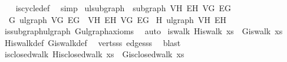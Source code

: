 \begin{isabellebody}
%
\isadelimproof
\ \ %
\endisadelimproof
%
\isatagproof
{}\isamarkupfalse%
\ is{\isacharunderscore}{\kern0pt}cycle{}{\isacharunderscore}{\kern0pt}def\ \isamarkupfalse%
\ simp%
\endisatagproof
{\isafoldproof}%
%
\isadelimproof
%
\endisadelimproof
%
\isadelimdocument
%
\endisadelimdocument
%
\isatagdocument
%
\isamarkuptrue%
%
\endisatagdocument
{\isafolddocument}%
%
\isadelimdocument
%
\endisadelimdocument
{}\isamarkupfalse%
\ ulsubgraph\ {\isacharequal}{\kern0pt}\ subgraph\ V\isactrlsub H\ E\isactrlsub H\ V\isactrlsub G\ E\isactrlsub G\ {\isacharplus}{\kern0pt}\isanewline
\ \ G{\isacharcolon}{\kern0pt}\ ulgraph\ V\isactrlsub G\ E\isactrlsub G\ \ V\isactrlsub H\ E\isactrlsub H\ V\isactrlsub G\ E\isactrlsub G\isanewline
{}\isanewline
\isanewline
{}\isamarkupfalse%
\ H{\isacharcolon}{\kern0pt}\ ulgraph\ V\isactrlsub H\ E\isactrlsub H\isanewline
%
\isadelimproof
\ \ %
\endisadelimproof
%
\isatagproof
{}\isamarkupfalse%
\ is{\isacharunderscore}{\kern0pt}subgraph{\isacharunderscore}{\kern0pt}ulgraph\ G{\isachardot}{\kern0pt}ulgraph{\isacharunderscore}{\kern0pt}axioms\ \isamarkupfalse%
\ auto%
\endisatagproof
{\isafoldproof}%
%
\isadelimproof
\isanewline
%
\endisadelimproof
\isanewline
{}\isamarkupfalse%
\ is{\isacharunderscore}{\kern0pt}walk{\isacharcolon}{\kern0pt}\ {\isachardoublequoteopen}H{\isachardot}{\kern0pt}is{\isacharunderscore}{\kern0pt}walk\ xs\ {\isasymLongrightarrow}\ G{\isachardot}{\kern0pt}is{\isacharunderscore}{\kern0pt}walk\ xs{\isachardoublequoteclose}\isanewline
%
\isadelimproof
\ \ %
\endisadelimproof
%
\isatagproof
{}\isamarkupfalse%
\ H{\isachardot}{\kern0pt}is{\isacharunderscore}{\kern0pt}walk{\isacharunderscore}{\kern0pt}def\ G{\isachardot}{\kern0pt}is{\isacharunderscore}{\kern0pt}walk{\isacharunderscore}{\kern0pt}def\ \isamarkupfalse%
\ verts{\isacharunderscore}{\kern0pt}ss\ edges{\isacharunderscore}{\kern0pt}ss\ \isamarkupfalse%
\ blast%
\endisatagproof
{\isafoldproof}%
%
\isadelimproof
\isanewline
%
\endisadelimproof
\isanewline
{}\isamarkupfalse%
\ is{\isacharunderscore}{\kern0pt}closed{\isacharunderscore}{\kern0pt}walk{\isacharcolon}{\kern0pt}\ {\isachardoublequoteopen}H{\isachardot}{\kern0pt}is{\isacharunderscore}{\kern0pt}closed{\isacharunderscore}{\kern0pt}walk\ xs\ {\isasymLongrightarrow}\ G{\isachardot}{\kern0pt}is{\isacharunderscore}{\kern0pt}closed{\isacharunderscore}{\kern0pt}walk\ xs{\isachardoublequoteclose}\isanewline

\end{isabellebody}

